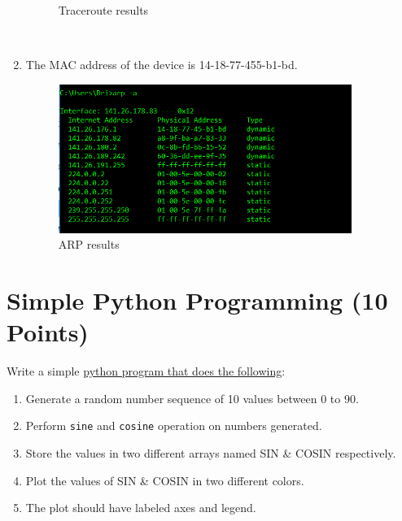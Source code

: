 \documentclass{WeSTassignment}
\begin{document}
\begin{enumerate}
\begin{figure}[!ht]
   \caption{Traceroute results}
     \label{fig:tracert}
\end{figure} \\
\item The MAC address of the device is 14-18-77-455-b1-bd.\\
\begin{figure}[!ht]
  \centering
  \includegraphics[width=0.9\textwidth]{arp.png}
   \caption{ARP results}
     \label{fig:arp}
\end{figure}
\end{enumerate}



\section{Simple Python Programming (10 Points)}

Write a simple \underline{python program that does the following}:
\begin{enumerate}
\item Generate a random number sequence of 10 values between 0 to 90. 
\item Perform \texttt{sine} and \texttt{cosine} operation on numbers generated. 
\item Store the values in two different arrays named SIN \& COSIN respectively. 
\item Plot the values of SIN \& COSIN in two different colors. 
\item The plot should have labeled axes and legend.
\end{enumerate}




\makefooter
\end{document}
